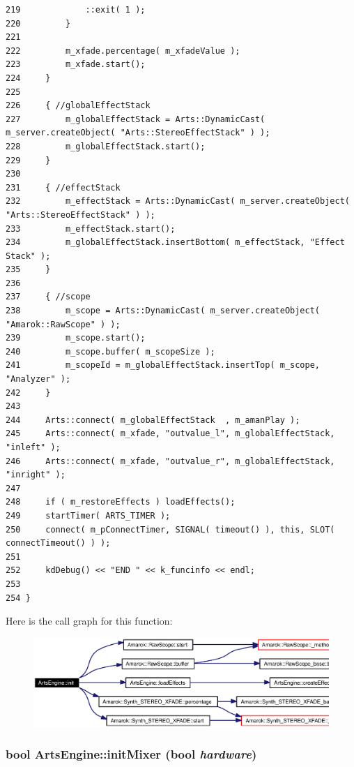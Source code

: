 \begin{verbatim}
219             ::exit( 1 );
220         }
221 
222         m_xfade.percentage( m_xfadeValue );
223         m_xfade.start();
224     }
225 
226     { //globalEffectStack
227         m_globalEffectStack = Arts::DynamicCast( m_server.createObject( "Arts::StereoEffectStack" ) );
228         m_globalEffectStack.start();
229     }
230 
231     { //effectStack
232         m_effectStack = Arts::DynamicCast( m_server.createObject( "Arts::StereoEffectStack" ) );
233         m_effectStack.start();
234         m_globalEffectStack.insertBottom( m_effectStack, "Effect Stack" );
235     }
236 
237     { //scope
238         m_scope = Arts::DynamicCast( m_server.createObject( "Amarok::RawScope" ) );
239         m_scope.start();
240         m_scope.buffer( m_scopeSize );
241         m_scopeId = m_globalEffectStack.insertTop( m_scope, "Analyzer" );
242     }
243 
244     Arts::connect( m_globalEffectStack  , m_amanPlay );
245     Arts::connect( m_xfade, "outvalue_l", m_globalEffectStack, "inleft" );
246     Arts::connect( m_xfade, "outvalue_r", m_globalEffectStack, "inright" );
247 
248     if ( m_restoreEffects ) loadEffects();
249     startTimer( ARTS_TIMER );
250     connect( m_pConnectTimer, SIGNAL( timeout() ), this, SLOT( connectTimeout() ) );
251 
252     kdDebug() << "END " << k_funcinfo << endl;
253     
254 }
\end{verbatim}\normalsize 


Here is the call graph for this function:\begin{figure}[H]
\begin{center}
\leavevmode
\includegraphics[width=336pt]{classArtsEngine_ArtsEnginea2_cgraph}
\end{center}
\end{figure}
\subsubsection{\setlength{\rightskip}{0pt plus 5cm}bool Arts\-Engine::init\-Mixer (bool {\em hardware})\hspace{0.3cm}{\tt  [virtual]}}\label{classArtsEngine_ArtsEnginea3}


